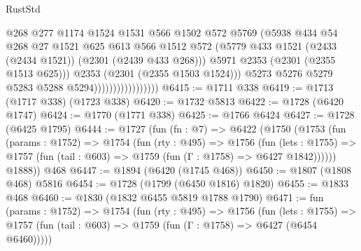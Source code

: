 \begin{lexlean}{RustStd}
\begin{coremodule}
                                        @268
                                        @277
                                        @1174
                                        @1524
                                        @1531
                                        @566
                                        @1502
                                        @572
                                        @5769
                                        (@5938
                                          @434
                                          @54
                                          @268
                                          @27
                                          @1521
                                          @625
                                          @613
                                          @566
                                          @1512
                                          @572
                                          (@5779
                                            @433
                                            @1521
                                            (@2433 (@2434 @1521))
                                            (@2301 (@2439 @433 @268)))
                                          @5971
                                          @2353
                                          (@2301 (@2355 @1513 @625)))
                                        @2353
                                        (@2301 (@2355 @1503 @1524)))
                                      @5273
                                      @5276
                                      @5279
                                      @5283
                                      @5288
                                      @5294)))))))))))))))))
@6415 := @1711 @338
@6419 := @1713 (@1717 @338) (@1723 @338)
@6420 := @1732 @5813
@6422 := @1728 (@6420 @1747)
@6424 := @1770 (@1771 @338)
@6425 := @1766 @6424
@6427 := @1728 (@6425 @1795)
@6444 := @1727
    (fun (fn : @7) =>
    @6422
      (@1750
        (@1753
          (fun (params : @1752) =>
          @1754
            (fun (rty : @495) =>
            @1756
              (fun (lets : @1755) =>
              @1757 (fun (tail : @603) => @1759 (fun (Γ : @1758) => @6427 @1842))))))
        @1888))
    @468
@6447 := @1894 (@6420 (@1745 @468))
@6450 := @1807 (@1808 @468) @5816
@6454 := @1728 (@1799 (@6450 @1816) @1820)
@6455 := @1833 @468
@6460 := @1830 (@1832 @6455 @5819 @1788 @1790)
@6471 := fun (params : @1752) =>
  @1754
    (fun (rty : @495) =>
    @1756
      (fun (lets : @1755) =>
      @1757 (fun (tail : @603) => @1759 (fun (Γ : @1758) => @6427 (@6454 @6460)))))

\end{coremodule}
\end{lexlean}
